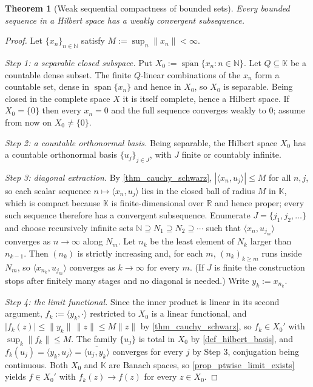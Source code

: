 \documentclass[a4paper]{report}
\theoremstyle{plain}
\newtheorem{theorem}{Theorem}[chapter]
\theoremstyle{definition}
\theoremstyle{remark}
\begin{document}
\begin{theorem}[Weak sequential compactness of bounded sets]
  \label{thm_weak_compactness}
  Every bounded sequence in a Hilbert space has a weakly convergent subsequence.
\end{theorem}
\begin{proof}
  Let $\{x_n\}_{n \in \mathbb{N}}$ satisfy $M := \sup_n\|x_n\| < \infty$.

  \emph{Step 1: a separable closed subspace.}  Put
  $X_0 := \overline{\operatorname{span}}\{x_n : n \in \mathbb{N}\}$.  Let
  $Q \subseteq \mathbb{K}$ be a countable dense subset.  The finite $Q$-linear combinations
  of the $x_n$ form a countable set, dense in $\operatorname{span}\{x_n\}$ and hence in
  $X_0$, so $X_0$ is separable.  Being closed in the complete space $X$ it is itself
  complete, hence a Hilbert space.  If $X_0 = \{0\}$ then every $x_n = 0$ and the full
  sequence converges weakly to $0$; assume from now on $X_0 \ne \{0\}$.

  \emph{Step 2: a countable orthonormal basis.}  Being separable, the Hilbert space $X_0$
  has a countable orthonormal basis $\{u_j\}_{j \in J}$, with $J$
  finite or countably infinite.

  \emph{Step 3: diagonal extraction.}  By \cref{thm_cauchy_schwarz},
  $|\langle x_n, u_j\rangle| \le M$ for all $n,j$, so each scalar sequence
  $n \mapsto \langle x_n,u_j\rangle$ lies in the closed ball of radius $M$ in $\mathbb{K}$,
  which is compact because $\mathbb{K}$ is finite-dimensional over $\mathbb{R}$ and hence
  proper; every such sequence therefore has
  a convergent subsequence.  Enumerate
  $J = \{j_1,j_2,\dots\}$ and choose recursively infinite sets
  $\mathbb{N} \supseteq N_1 \supseteq N_2 \supseteq \cdots$ such that
  $\langle x_n, u_{j_m}\rangle$ converges as $n \to \infty$ along $N_m$.  Let $n_k$ be the
  least element of $N_k$ larger than $n_{k-1}$.  Then $(n_k)$ is strictly increasing and,
  for each $m$, $(n_k)_{k \ge m}$ runs inside $N_m$, so $\langle x_{n_k},u_{j_m}\rangle$
  converges as $k \to \infty$ for every $m$.  (If $J$ is finite the construction stops
  after finitely many stages and no diagonal is needed.)  Write $y_k := x_{n_k}$.

  \emph{Step 4: the limit functional.}  Since the inner product is linear in its second
  argument, $f_k := \langle y_k, \cdot\rangle$ restricted to $X_0$ is a linear functional,
  and $|f_k(z)| \le \|y_k\|\,\|z\| \le M\|z\|$ by \cref{thm_cauchy_schwarz}, so
  $f_k \in X_0'$ with $\sup_k\|f_k\| \le M$.  The family $\{u_j\}$ is total in $X_0$ by
  \cref{def_hilbert_basis}, and
  $f_k(u_j) = \langle y_k, u_j\rangle = \overline{\langle u_j, y_k\rangle}$ converges for
  every $j$ by Step 3, conjugation being continuous.  Both $X_0$ and $\mathbb{K}$ are
  Banach spaces, so \cref{prop_ptwise_limit_exists} yields $f \in X_0'$ with
  $f_k(z) \to f(z)$ for every $z \in X_0$.


\end{proof}
\end{document}
